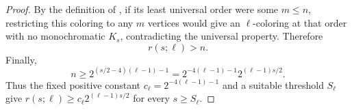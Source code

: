 \begin{proof}
By the definition of , if its least
universal order were some $m\leq n$, restricting this coloring to any $m$
vertices would give an $\ell$-coloring at that order with no monochromatic
$K_s$, contradicting the universal property.  Therefore
\[
 r(s;\ell)>n.
\]
Finally,
\[
 n\geq 2^{(s/2-4)(\ell-1)-1}
 =2^{-4(\ell-1)-1}2^{(\ell-1)s/2}.
\]
Thus the fixed positive constant
$c_\ell=2^{-4(\ell-1)-1}$ and a suitable threshold $S_\ell$ give
$r(s;\ell)\geq c_\ell2^{(\ell-1)s/2}$ for every $s\geq S_\ell$.
\end{proof}
